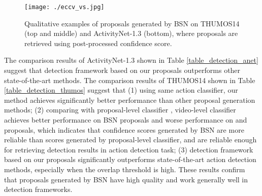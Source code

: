 \documentclass[runningheads]{llncs}
\begin{document}
\begin{figure}[t]
\setlength{\abovecaptionskip}{-0.3cm} %
\setlength{\belowcaptionskip}{-0.3cm} %
\begin{center}
\begin{minipage}[b]{1.0\linewidth}
  \centering
  \centerline{\texttt{[image: ./eccv\_vs.jpg]}}
  \medskip
\end{minipage}
\end{center}
   \caption{Qualitative examples of proposals generated by BSN on THUMOS14 (top and middle) and ActivityNet-1.3 (bottom), where proposals are retrieved using  post-processed confidence score. }
\label{fig_vs}
\vspace{-0.2cm}
\end{figure}

The comparison results of ActivityNet-1.3 shown in Table \ref{table_detection_anet} suggest that  detection framework based on our proposals outperforms other state-of-the-art methods.
The comparison results of THUMOS14 shown in Table \ref{table_detection_thumos} suggest that
(1) using same action classifier, our method achieves significantly better performance than other proposal generation methods;
%
(2) comparing  with  proposal-level classifier \cite{shou2016action}, video-level classifier \cite{wang2017untrimmednets} achieves better performance on BSN proposals and worse performance  on \cite{sst_buch_cvpr17} and \cite{gao2017turn} proposals, which indicates that confidence scores generated by BSN are more reliable than scores generated by proposal-level classifier, and are reliable enough for retrieving detection results in action detection task;
%
(3) detection framework based on our proposals significantly outperforms  state-of-the-art action detection methods, especially when the overlap threshold is high.
These results confirm that proposals generated by BSN have high quality and work generally well in detection frameworks. %





\end{document}
